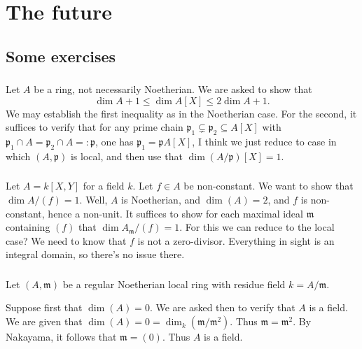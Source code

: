 \documentclass[reqno]{amsart}
\begin{document}
\section{The future}
\label{sec:org75bf553}

\subsection{Some exercises}
\label{sec:orge6fe150}

\subsubsection{}
\label{sec:org29f0766}

Let \(A\) be a ring, not necessarily Noetherian.
We are asked to show that
\[
    \dim A + 1 \leq \dim A[X] \leq 2 \dim A + 1.
  \]
We may establish the first inequality
as in the Noetherian case.
For the second,
it suffices to verify that
for any prime chain
\(\mathfrak{p}_1 \subsetneq \mathfrak{p}_2 \subseteq A[X]\)
with \(\mathfrak{p}_1 \cap A = \mathfrak{p}_2 \cap A =:
  \mathfrak{p}\),
one has \(\mathfrak{p}_1 = \mathfrak{p} A[X]\),
I think we just reduce to case in which \((A,\mathfrak{p})\)
is local,
and then use that \(\dim (A/\mathfrak{p})[X] = 1\).


\subsubsection{}
\label{sec:org0e0b82b}

Let \(A = k[X,Y]\)
for a field \(k\).
Let \(f \in A\) be non-constant.
We want to show that \(\dim A/(f) = 1\).
Well, \(A\) is Noetherian,
and \(\dim(A) = 2\),
and \(f\) is non-constant,
hence a non-unit.
It suffices to show for each maximal ideal \(\mathfrak{m}\)
containing \((f)\)
that \(\dim A_\mathfrak{m}/(f) = 1\).
For this we can reduce to the local case?
We need to know that \(f\) is not a zero-divisor.
Everything in sight is an integral domain,
so there's no issue there.


\subsubsection{}
\label{sec:org6c497dd}

Let \((A,\mathfrak{m})\) be a regular Noetherian local ring with residue field \(k = A/\mathfrak{m}\).

Suppose first that \(\dim(A) = 0\).  We are asked then to verify
that \(A\) is a field.  We are given that
\(\dim(A) = 0 = \dim_k(\mathfrak{m}/\mathfrak{m}^2)\).
Thus \(\mathfrak{m} = \mathfrak{m}^2\).
By Nakayama, it follows that \(\mathfrak{m} = (0)\).
Thus \(A\) is a field.
\end{document}
